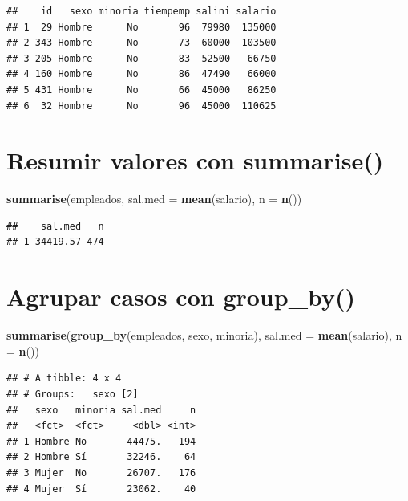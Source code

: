 \documentclass[]{book}
\newenvironment{Shaded}{\begin{snugshade}}{\end{snugshade}}
\newcommand{\DataTypeTok}[1]{\textcolor[rgb]{0.13,0.29,0.53}{#1}}
\newcommand{\KeywordTok}[1]{\textcolor[rgb]{0.13,0.29,0.53}{\textbf{#1}}}
\newcommand{\NormalTok}[1]{#1}
\begin{document}
\begin{verbatim}
##    id   sexo minoria tiempemp salini salario
## 1  29 Hombre      No       96  79980  135000
## 2 343 Hombre      No       73  60000  103500
## 3 205 Hombre      No       83  52500   66750
## 4 160 Hombre      No       86  47490   66000
## 5 431 Hombre      No       66  45000   86250
## 6  32 Hombre      No       96  45000  110625
\end{verbatim}

\hypertarget{resumir-valores-con-summarise}{%
\section{\texorpdfstring{Resumir valores con \textbf{summarise()}}{Resumir valores con summarise()}}\label{resumir-valores-con-summarise}}

\begin{Shaded}
\begin{Highlighting}[]
\KeywordTok{summarise}\NormalTok{(empleados, }\DataTypeTok{sal.med =} \KeywordTok{mean}\NormalTok{(salario), }\DataTypeTok{n =} \KeywordTok{n}\NormalTok{())}
\end{Highlighting}
\end{Shaded}

\begin{verbatim}
##    sal.med   n
## 1 34419.57 474
\end{verbatim}

\hypertarget{agrupar-casos-con-group_by}{%
\section{\texorpdfstring{Agrupar casos con \textbf{group\_by()}}{Agrupar casos con group\_by()}}\label{agrupar-casos-con-group_by}}

\begin{Shaded}
\begin{Highlighting}[]
\KeywordTok{summarise}\NormalTok{(}\KeywordTok{group_by}\NormalTok{(empleados, sexo, minoria), }\DataTypeTok{sal.med =} \KeywordTok{mean}\NormalTok{(salario), }\DataTypeTok{n =} \KeywordTok{n}\NormalTok{())}
\end{Highlighting}
\end{Shaded}

\begin{verbatim}
## # A tibble: 4 x 4
## # Groups:   sexo [2]
##   sexo   minoria sal.med     n
##   <fct>  <fct>     <dbl> <int>
## 1 Hombre No       44475.   194
## 2 Hombre Sí       32246.    64
## 3 Mujer  No       26707.   176
## 4 Mujer  Sí       23062.    40
\end{verbatim}
\end{document}
